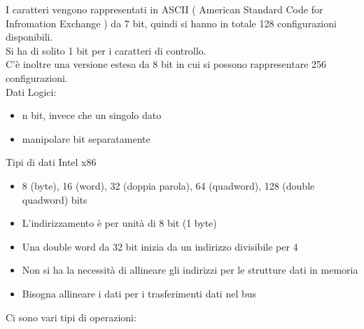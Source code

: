 \documentclass[arch.tex]{subfiles}
\begin{document}
I caratteri vengono rappresentati in ASCII ( American Standard Code for
Infromation Exchange ) da 7 bit, quindi si hanno in totale 128 configurazioni
disponibili.\\
Si ha di solito 1 bit per i caratteri di controllo.\\
C'è inoltre una versione estesa da 8 bit in cui si possono rappresentare 256 
configurazioni.\\
Dati Logici:

\begin{itemize}
	\item n bit, invece che un singolo dato
	\item manipolare bit separatamente
\end{itemize}

Tipi di dati Intel x86

\begin{itemize}
	\item 8 (byte), 16 (word), 32 (doppia parola), 64 (quadword), 128 (double quadword) bits
	\item L'indirizzamento è per unità di 8 bit (1 byte)
	\item Una double word da 32 bit inizia da un indirizzo divisibile per 4
	\item Non si ha la necessità di allineare gli indirizzi per le strutture dati in memoria
	\item Bisogna allineare i dati per i trasferimenti dati nel bus
\end{itemize}

Ci sono vari tipi di operazioni:
\end{document}
